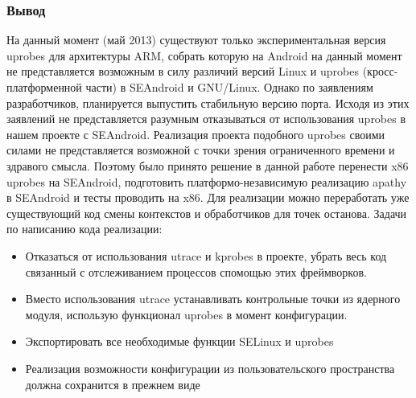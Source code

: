 \subsubsection{Вывод}

На данный момент (май 2013) существуют только экспериментальная версия
uprobes для архитектуры ARM, собрать которую на Android на данный момент
не представляется возможным в силу различий версий Linux и uprobes
(кросс-платформенной части) в  SEAndroid и GNU/Linux. Однако по
заявлениям разработчиков, планируется выпустить стабильную версию порта.
Исходя из этих заявлений не представляется разумным отказываться от
использования uprobes в нашем проекте с SEAndroid. Реализация проекта
подобного uprobes своими силами не представляется возможной с точки
зрения ограниченного времени и здравого смысла. Поэтому было принято
решение в данной работе перенести x86 uprobes на SEAndroid, подготовить
платформо-независимую реализацию apathy в SEAndroid и тесты проводить на
x86. Для реализации можно переработать уже существующий код смены
контекстов и обработчиков для точек останова. Задачи по написанию кода
реализации:

\begin{itemize}

\item Отказаться от использования utrace и kprobes в проекте, убрать
    весь код связанный с отслеживанием процессов спомощью этих
    фреймворков.

\item Вместо использования utrace устанавливать контрольные точки
    из ядерного модуля, использую функционал uprobes в момент
    конфигурации.

\item Экспортировать все необходимые функции SELinux и uprobes

\item Реализация возможности конфигурации из пользовательского
        пространства должна сохранится в прежнем виде
        
\end{itemize}

